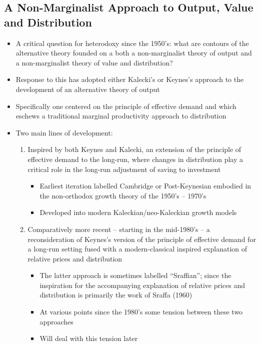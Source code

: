 \documentclass{article}
\begin{document}
\subsection{A Non-Marginalist Approach to Output, Value and Distribution}
	\begin{itemize}
		\item A critical question for heterodoxy since the 1950's: what are contours of the alternative theory founded on a both a non-marginalist theory of output and a non-marginalist theory of value and distribution?
		\item Response to this has adopted either Kalecki's or Keynes's approach to the development of an alternative theory of output
		\item Specifically one centered on the principle of effective demand and which eschews a traditional marginal productivity approach to distribution
		\item Two main lines of development:
		\begin{enumerate}[label=\textbf{\arabic*.}]
			\item Inspired by both Keynes and Kalecki, an extension of the principle of effective demand to the long-run, where changes in distribution play a critical role in the long-run adjustment of saving to investment
			\begin{itemize}
				\item Earliest iteration labelled Cambridge or Post-Keynesian embodied in the non-orthodox growth theory of the 1950's -- 1970's
				\item Developed into modern Kaleckian/neo-Kaleckian growth models
			\end{itemize}
			\item Comparatively more recent -- starting in the mid-1980's -- a reconsideration of Keynes's version of the principle of effective demand for a long-run setting fused with a modern-classical inspired explanation of relative prices and distribution
			\begin{itemize}
				\item The latter approach is sometimes labelled ``Sraffian''; since the inspiration for the accompanying explanation of relative prices and distribution is primarily the work of Sraffa (1960)
				\item At various points since the 1980's some tension between these two approaches
				\item Will deal with this tension later
			\end{itemize}
		\end{enumerate}
	\end{itemize}
\end{document}
